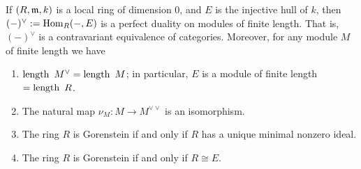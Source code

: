 \begin{theorem}\label{duality for Gor}
If $(R,\gm,k)$ is a local ring of dimension $0$, and $E$ is the injective hull of $k$, then 
$(-)^{\vee} := \Hom_{R}(-,E)$ is a perfect duality on modules of finite length. That is,
 $(-)^{\vee}$ is a contravariant equivalence of categories. Moreover, for any module $M$ of finite length we have
\begin{enumerate}
\item $\length\ M^{\vee} = \length\ M$; in particular, $E$ is a module of finite length $= \length\ R$.
\item The natural map $\nu_{M}: M\to M^{\vee\vee}$ is an isomorphism.
\item The ring $R$ is Gorenstein if and only if $R$ has a unique minimal nonzero ideal.
\item The ring $R$ is Gorenstein if and only if $R\cong E$.
\end{enumerate}
\end{theorem}

